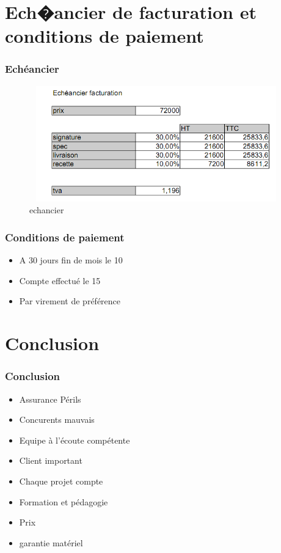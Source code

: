 \documentclass{beamer}
\begin{document}
\section{Ech�ancier de facturation et conditions de paiement}
\begin{frame}\frametitle{Echéancier}

\begin{figure}[t]
\centering
\includegraphics[height=5cm,width=11cm]{images/echancier.PNG}
\caption{echancier}
\label{echancier}
\end{figure}


\end{frame}


\begin{frame}\frametitle{Conditions de paiement}
\begin {itemize}
\item A 30 jours fin de mois le 10
\item Compte effectué le 15
\item Par virement de préférence
\end {itemize}
\end{frame}


\section{Conclusion}
\begin{frame}\frametitle{Conclusion}

\begin {itemize}
\item Assurance Périls
\item Concurents mauvais
\item Equipe à l'écoute compétente
\item Client important
\item Chaque projet compte
\item Formation et pédagogie
\item Prix
\item garantie matériel

\end {itemize}

\end{frame}
\end{document}
